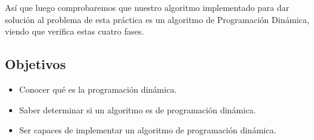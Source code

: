 Así que luego comprobaremos que nuestro algoritmo implementado para dar solución al problema de esta práctica es un algoritmo
de Programación Dinámica, viendo que verifica estas cuatro fases.

\subsection{Objetivos}
\begin{itemize}
    \item Conocer qué es la programación dinámica.
    \item Saber determinar si un algoritmo es de programación dinámica.
    \item Ser capaces de implementar un algoritmo de programación dinámica.
\end{itemize}

